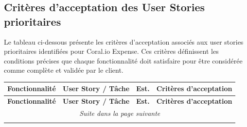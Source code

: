 \documentclass[12pt,a4paper]{report}
\begin{document}
\newpage

\subsection{Critères d’acceptation des User Stories prioritaires}

Le tableau ci-dessous présente les critères d'acceptation associés aux user stories prioritaires identifiées pour Coral.io Expense. Ces critères définissent les conditions précises que chaque fonctionnalité doit satisfaire pour être considérée comme complète et validée par le client.

\label{tab:Critères}
\begin{longtable}{|p{2.5cm}|p{3cm}|p{1.5cm}|p{8cm}|}
\hline
\textbf{Fonctionnalité} & \textbf{User Story / Tâche} & \textbf{Est.} & \textbf{Critères d’acceptation} \\
\hline
\endfirsthead
\hline
\textbf{Fonctionnalité} & \textbf{User Story / Tâche} & \textbf{Est.} & \textbf{Critères d’acceptation} \\
\hline
\endhead
\hline
\multicolumn{4}{|c|}{\textit{Suite dans la page suivante}} \\
\hline
\endfoot
\hline
\endlastfoot


\end{longtable}
\end{document}
